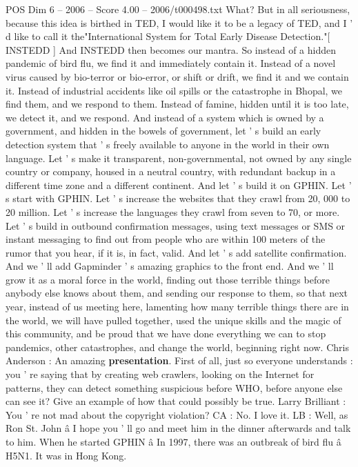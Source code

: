 \begin{textsample}{POS Dim 6 – 2006 – Score 4.00 – 2006/t000498.txt}
What?
But in all seriousness, because this idea is birthed in TED, I would like it to be a legacy of TED, and I ' d like to call it the"International System for Total Early Disease Detection."[ INSTEDD ] And INSTEDD then becomes our mantra.
So instead of a hidden pandemic of bird flu, we find it and immediately contain it.
Instead of a novel virus caused by bio-terror or bio-error, or shift or drift, we find it and we contain it.
Instead of industrial accidents like oil spills or the catastrophe in Bhopal, we find them, and we respond to them.
Instead of famine, hidden until it is too late, we detect it, and we respond.
And instead of a system which is owned by a government, and hidden in the bowels of government, let ' s build an early detection system that ' s freely available to anyone in the world in their own language.
Let ' s make it transparent, non-governmental, not owned by any single country or company, housed in a neutral country, with redundant backup in a different time zone and a different continent.
And let ' s build it on GPHIN.
Let ' s start with GPHIN.
Let ' s increase the websites that they crawl from 20, 000 to 20 million.
Let ' s increase the languages they crawl from seven to 70, or more.
Let ' s build in outbound confirmation messages, using text messages or SMS or instant messaging to find out from people who are within 100 meters of the rumor that you hear, if it is, in fact, valid.
And let ' s add satellite confirmation.
And we ' ll add Gapminder ' s amazing graphics to the front end.
And we ' ll grow it as a moral force in the world, finding out those terrible things before anybody else knows about them, and sending our response to them, so that next year, instead of us meeting here, lamenting how many terrible things there are in the world, we will have pulled together, used the unique skills and the magic of this community, and be proud that we have done everything we can to stop pandemics, other catastrophes, and change the world, beginning right now.
Chris Anderson : An amazing \textbf{presentation}.
First of all, just so everyone understands : you ' re saying that by creating web crawlers, looking on the Internet for patterns, they can detect something suspicious before WHO, before anyone else can see it?
Give an example of how that could possibly be true.
Larry Brilliant : You ' re not mad about the copyright violation?
CA : No.
I love it.
LB : Well, as Ron St.
John â I hope you ' ll go and meet him in the dinner afterwards and talk to him.
When he started GPHIN â In 1997, there was an outbreak of bird flu â H5N1.
It was in Hong Kong.

\end{textsample}
